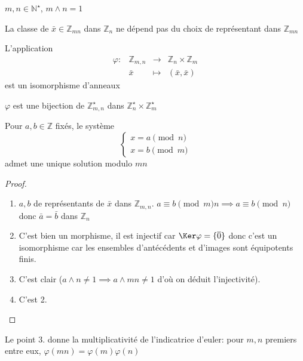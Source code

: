\begin{thm}
    \Hyp $m, n\in\mathbb N^\star$, $m\land n=1$
    \begin{concenum}
    \item La classe de $\bar x\in\mathbb Z_{mn}$ dans $\mathbb Z_n$ ne dépend pas du choix de représentant dans $\mathbb Z_{mn}$
    \item L'application \[
            \begin{matrix}
                \varphi: & \mathbb Z_{m, n} & \longrightarrow & \mathbb Z_n\times \mathbb Z_m \\
                         & \bar x &\longmapsto & (\bar x, \bar x)
            \end{matrix}
        \]
        est un isomorphisme d'anneaux
    \item $\varphi$ est une bijection de $\mathbb Z_{m, n}^\star$ dans $\mathbb Z_n^\star \times \mathbb Z_m^\star$
    \item Pour $a, b\in\mathbb Z$ fixés, le système \[
            \begin{cases}
                x=a\pmod n\\
                x=b\pmod m
            \end{cases}
        \]
        admet une unique solution modulo $mn$
    \end{concenum}
\end{thm}

\begin{proof}~
    \begin{enumerate}
        \item $a, b$ de représentants de $\bar x$ dans $\mathbb Z_{m, n}$. $a\equiv b\pmod mn\implies a\equiv b\pmod n$ donc $\bar a=\bar b$ dans $\mathbb Z_n$
        \item C'est bien un morphisme, il est injectif car $\Ker\varphi=\{\bar 0\}$ donc c'est un isomorphisme car les ensembles d'antécédents et d'images sont équipotents finis.
        \item C'est clair ($a\land n\neq 1\implies a\land mn\neq 1$ d'où on déduit l'injectivité).
        \item C'est 2.
    \end{enumerate}
\end{proof}

\begin{rem}
    Le point 3. donne la multiplicativité de l'indicatrice d'euler: pour $m, n$ premiers entre eux, $\varphi(mn)=\varphi(m)\varphi(n)$
\end{rem}

